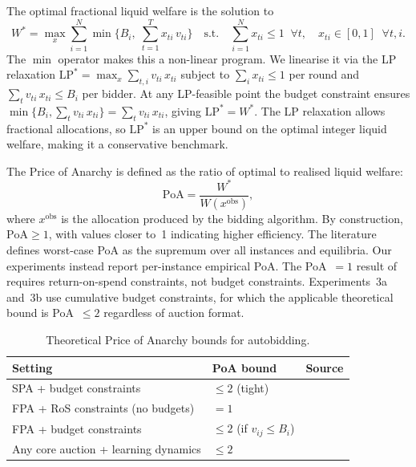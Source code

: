 The optimal fractional liquid welfare is the solution to
\begin{equation}
  W^* = \max_{x} \sum_{i=1}^{N} \min\!\Big\{B_i,\; \sum_{t=1}^{T} x_{ti}\, v_{ti}\Big\}
  \quad \text{s.t.} \quad
  \sum_{i=1}^{N} x_{ti} \leq 1 \;\; \forall t, \quad
  x_{ti} \in [0,1] \;\; \forall t,i.
  \label{eq:welfare_opt}
\end{equation}
The $\min$ operator makes this a non-linear program. We linearise it via the LP relaxation $\mathrm{LP}^* = \max_{x} \sum_{t,i} v_{ti}\, x_{ti}$ subject to $\sum_i x_{ti} \le 1$ per round and $\sum_t v_{ti}\, x_{ti} \le B_i$ per bidder. At any LP-feasible point the budget constraint ensures $\min\{B_i, \sum_t v_{ti}\, x_{ti}\} = \sum_t v_{ti}\, x_{ti}$, giving $\mathrm{LP}^* = W^*$. The LP relaxation allows fractional allocations, so $\mathrm{LP}^*$ is an upper bound on the optimal integer liquid welfare, making it a conservative benchmark.

The Price of Anarchy is defined as the ratio of optimal to realised liquid welfare:
\begin{equation}
  \text{PoA} = \frac{W^*}{W(x^{\text{obs}})},
  \label{eq:poa_def}
\end{equation}
where $x^{\text{obs}}$ is the allocation produced by the bidding algorithm. By construction, $\text{PoA} \geq 1$, with values closer to~1 indicating higher efficiency. The literature defines worst-case PoA as the supremum over all instances and equilibria. Our experiments instead report per-instance empirical PoA. The PoA~$= 1$ result of \citet{Deng2021TowardsEfficient} requires return-on-spend constraints, not budget constraints. Experiments~3a and~3b use cumulative budget constraints, for which the applicable theoretical bound is PoA~$\leq 2$ regardless of auction format.

\begin{table}[H]
\centering
\small
\caption{Theoretical Price of Anarchy bounds for autobidding.}
\label{tab:poa_bounds}
\begin{tabular}{lll}
\toprule
\textbf{Setting} & \textbf{PoA bound} & \textbf{Source} \\
\midrule
SPA + budget constraints & $\leq 2$ (tight) & \citet{Aggarwal2019} \\
FPA + RoS constraints (no budgets) & $= 1$ & \citet{Deng2021TowardsEfficient} \\
FPA + budget constraints & $\leq 2$ (if $v_{ij} \leq B_i$) & \citet{Aggarwal2024Survey} \\
Any core auction + learning dynamics & $\leq 2$ & \citet{Gaitonde2023} \\
\bottomrule
\end{tabular}
\end{table}

